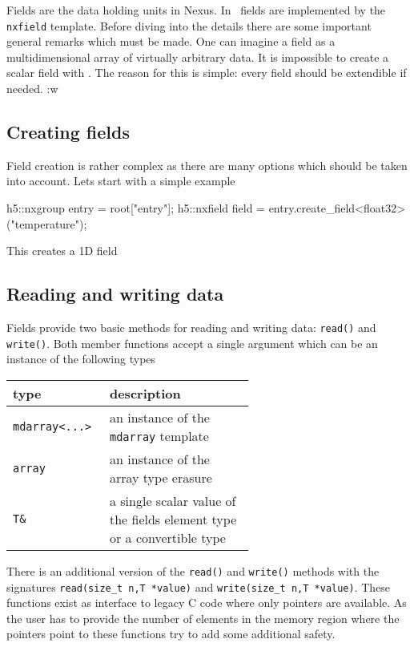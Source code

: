 Fields are the data holding units in Nexus.  In \libpniio\ fields are 
implemented by the {\tt nxfield} template. Before diving into the details there
are some important general remarks which must be made. One can imagine a field as a
multidimensional array of virtually arbitrary data. It is impossible to create 
a scalar field with \libpniio. The reason for this is simple: every field should
be extendible if needed. :w


\subsection{Creating fields}

Field creation is rather complex as there are many options which should be taken
into account. Lets start with a simple example
\begin{cppcode}
h5::nxgroup entry = root["entry"];
h5::nxfield field = entry.create_field<float32>("temperature");
\end{cppcode}
This creates a 1D field

\subsection{Reading and writing data}

Fields provide two basic methods for reading and writing data: {\tt read()} and 
{\tt write()}. 
Both member functions accept a single argument which can be an instance of the
following types
\begin{center}
    \begin{tabular}{l|p{0.6\linewidth}}
        {\bf type} & {\bf description} \\
        \hline
        \hline
        {\tt mdarray<...>} & an instance of the {\tt mdarray} template \\
        \hline
        {\tt array} & an instance of the array type erasure \\
        \hline
        {\tt T\& } & a single scalar value of the fields element type or a 
        convertible type \\
        \hline
    \end{tabular}
\end{center}
There is an additional version of the {\tt read()} and {\tt write()} methods
with the signatures {\tt read(size\_t n,T *value)}
and {\tt write(size\_t n,T *value)}. These functions exist as interface to
legacy C code where only pointers are available. As the user has to provide the
number of elements in the memory region where the pointers point to these
functions try to add some additional safety.

